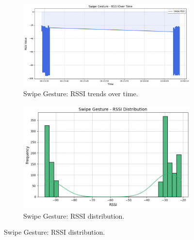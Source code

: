 \documentclass[10pt,twocolumn,letterpaper]{article}
\begin{document}
\begin{figure}[t]
  \centering

  \begin{subfigure}{0.45\linewidth}
    \centering
    \includegraphics[width=\linewidth]{figures/swipe_rssi_trends.png}
    \caption{Swipe Gesture: RSSI trends over time.}
    \label{fig:swipe_rssi_trends}
  \end{subfigure}
  \hfill
  \begin{subfigure}{0.45\linewidth}
    \centering
    \includegraphics[width=\linewidth]{figures/swipe_rssi_distribution.png}
    \caption{Swipe Gesture: RSSI distribution.}
    \label{fig:swipe_rssi_distribution}
  \end{subfigure}

  \vspace{0.5cm} %


\end{figure}
\end{document}
